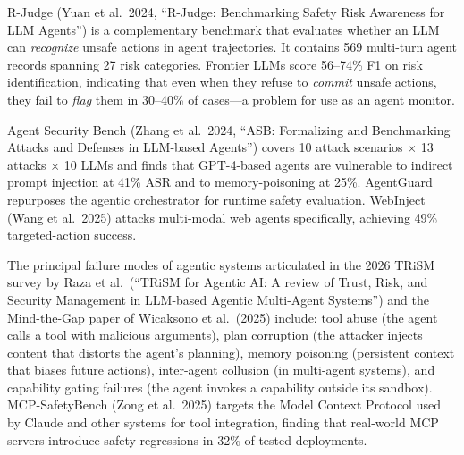 \documentclass{article}
\begin{document}
R-Judge (Yuan et al.~2024, ``R-Judge: Benchmarking Safety Risk Awareness for LLM Agents'') is a complementary benchmark that evaluates whether an LLM can \emph{recognize} unsafe actions in agent trajectories. It contains 569 multi-turn agent records spanning 27 risk categories. Frontier LLMs score 56--74\% F1 on risk identification, indicating that even when they refuse to \emph{commit} unsafe actions, they fail to \emph{flag} them in 30--40\% of cases---a problem for use as an agent monitor.

Agent Security Bench (Zhang et al.~2024, ``ASB: Formalizing and Benchmarking Attacks and Defenses in LLM-based Agents'') covers 10 attack scenarios × 13 attacks × 10 LLMs and finds that GPT-4-based agents are vulnerable to indirect prompt injection at 41\% ASR and to memory-poisoning at 25\%. AgentGuard \citep{chen2025metasecalignasecur} repurposes the agentic orchestrator for runtime safety evaluation. WebInject (Wang et al.~2025) attacks multi-modal web agents specifically, achieving 49\% targeted-action success.

The principal failure modes of agentic systems articulated in the 2026 TRiSM survey by Raza et al.~(``TRiSM for Agentic AI: A review of Trust, Risk, and Security Management in LLM-based Agentic Multi-Agent Systems'') and the Mind-the-Gap paper of Wicaksono et al.~(2025) include: tool abuse (the agent calls a tool with malicious arguments), plan corruption (the attacker injects content that distorts the agent's planning), memory poisoning (persistent context that biases future actions), inter-agent collusion (in multi-agent systems), and capability gating failures (the agent invokes a capability outside its sandbox). MCP-SafetyBench (Zong et al.~2025) targets the Model Context Protocol used by Claude and other systems for tool integration, finding that real-world MCP servers introduce safety regressions in 32\% of tested deployments.
\end{document}
